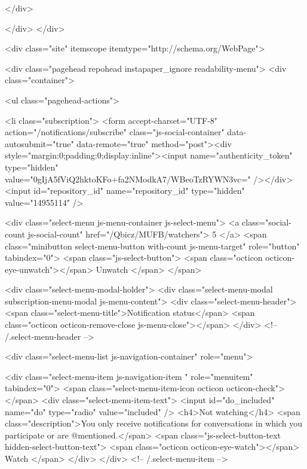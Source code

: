 </div>


    
  </div>
</div>

      

      




          <div class="site" itemscope itemtype="http://schema.org/WebPage">
    
    <div class="pagehead repohead instapaper_ignore readability-menu">
      <div class="container">
        

<ul class="pagehead-actions">

    <li class="subscription">
      <form accept-charset="UTF-8" action="/notifications/subscribe" class="js-social-container" data-autosubmit="true" data-remote="true" method="post"><div style="margin:0;padding:0;display:inline"><input name="authenticity_token" type="hidden" value="0gIjA5fViQ2hktoKFo+fa2NModkA7/WBeoTzRYWN3vc=" /></div>  <input id="repository_id" name="repository_id" type="hidden" value="14955114" />

    <div class="select-menu js-menu-container js-select-menu">
      <a class="social-count js-social-count" href="/Qbicz/MUFB/watchers">
        5
      </a>
      <span class="minibutton select-menu-button with-count js-menu-target" role="button" tabindex="0">
        <span class="js-select-button">
          <span class="octicon octicon-eye-unwatch"></span>
          Unwatch
        </span>
      </span>

      <div class="select-menu-modal-holder">
        <div class="select-menu-modal subscription-menu-modal js-menu-content">
          <div class="select-menu-header">
            <span class="select-menu-title">Notification status</span>
            <span class="octicon octicon-remove-close js-menu-close"></span>
          </div> <!-- /.select-menu-header -->

          <div class="select-menu-list js-navigation-container" role="menu">

            <div class="select-menu-item js-navigation-item " role="menuitem" tabindex="0">
              <span class="select-menu-item-icon octicon octicon-check"></span>
              <div class="select-menu-item-text">
                <input id="do_included" name="do" type="radio" value="included" />
                <h4>Not watching</h4>
                <span class="description">You only receive notifications for conversations in which you participate or are @mentioned.</span>
                <span class="js-select-button-text hidden-select-button-text">
                  <span class="octicon octicon-eye-watch"></span>
                  Watch
                </span>
              </div>
            </div> <!-- /.select-menu-item -->

